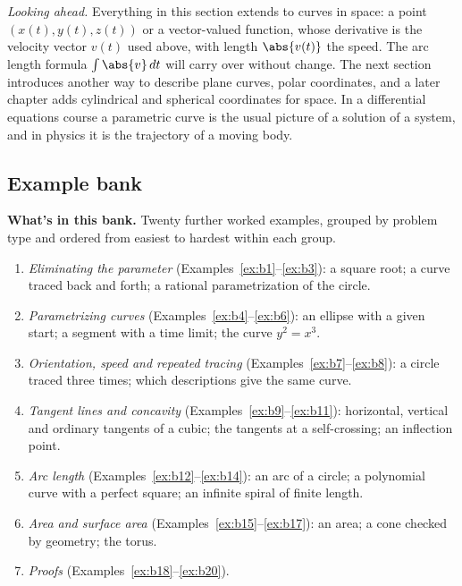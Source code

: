 \documentclass[11pt]{article}
\begin{document}
\emph{Looking ahead.} Everything in this section extends to curves in space: a point $(x(t),y(t),z(t))$ or a vector-valued function, whose derivative is the velocity vector $v(t)$ used above, with length $\abs{v(t)}$ the speed. The arc length formula $\int\abs{v}\,dt$ will carry over without change. The next section introduces another way to describe plane curves, polar coordinates, and a later chapter adds cylindrical and spherical coordinates for space. In a differential equations course a parametric curve is the usual picture of a solution of a system, and in physics it is the trajectory of a moving body.

\subsection*{Example bank}

\textbf{What's in this bank.} Twenty further worked examples, grouped by problem type and ordered from easiest to hardest within each group.
\begin{enumerate}[nosep]
  \item \emph{Eliminating the parameter} (Examples~\ref{ex:b1}--\ref{ex:b3}): a square root; a curve traced back and forth; a rational parametrization of the circle.
  \item \emph{Parametrizing curves} (Examples~\ref{ex:b4}--\ref{ex:b6}): an ellipse with a given start; a segment with a time limit; the curve $y^2=x^3$.
  \item \emph{Orientation, speed and repeated tracing} (Examples~\ref{ex:b7}--\ref{ex:b8}): a circle traced three times; which descriptions give the same curve.
  \item \emph{Tangent lines and concavity} (Examples~\ref{ex:b9}--\ref{ex:b11}): horizontal, vertical and ordinary tangents of a cubic; the tangents at a self-crossing; an inflection point.
  \item \emph{Arc length} (Examples~\ref{ex:b12}--\ref{ex:b14}): an arc of a circle; a polynomial curve with a perfect square; an infinite spiral of finite length.
  \item \emph{Area and surface area} (Examples~\ref{ex:b15}--\ref{ex:b17}): an area; a cone checked by geometry; the torus.
  \item \emph{Proofs} (Examples~\ref{ex:b18}--\ref{ex:b20}).
\end{enumerate}
\end{document}

